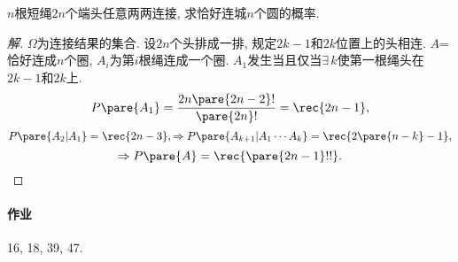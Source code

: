 \documentclass{ctexart}
\begin{document}
\begin{sample}
    \begin{ex}
        \label{ex:nn结绳问题}
        $n$根短绳$2n$个端头任意两两连接, 求恰好连城$n$个圆的概率.
    \end{ex}
    \begin{proof}[解]
        $\Omega$为连接结果的集合. 设$2n$个头排成一排, 规定$2k-1$和$2k$位置上的头相连. $A$=恰好连成$n$个圈, $A_i$为第$i$根绳连成一个圈. $A_1$发生当且仅当$\exists\, k$使第一根绳头在$2k-1$和$2k$上.
        \[ P\pare{A_1} = \frac{2n\pare{2n-2}!}{\pare{2n}!} = \rec{2n-1}, \]
        \[ P\pare{A_2\vert A_1} = \rec{2n-3}, \Rightarrow P\pare{A_{k+1}\vert A_1\cdots A_k} = \rec{2\pare{n-k}-1}, \]
        \[ \Rightarrow P\pare{A} = \rec{\pare{2n-1}!!}. \qedhere \]
    \end{proof}
\end{sample}
\paragraph{作业} %
\label{par:作业}

16, 18, 39, 47.

\end{document}
